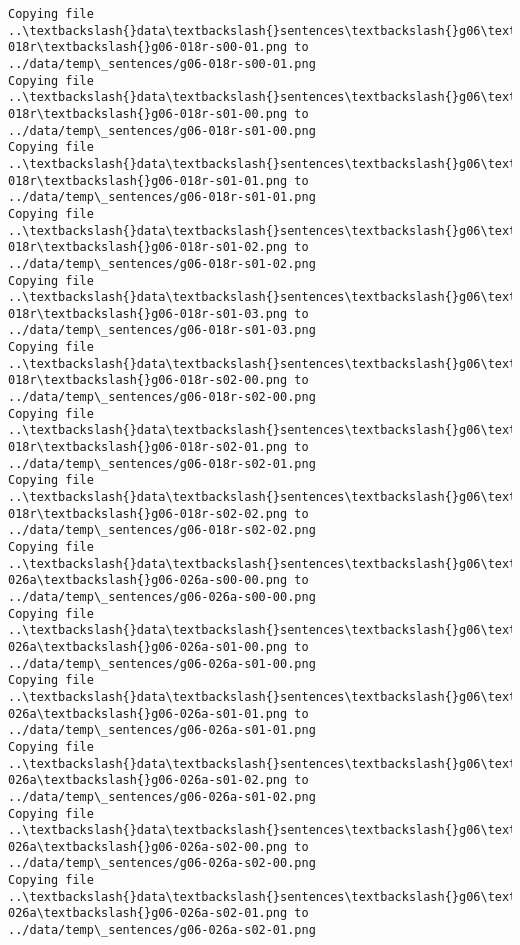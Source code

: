 \documentclass[11pt]{article}
\begin{document}
\begin{Verbatim}[commandchars=\\\{\}]
Copying file ..\textbackslash{}data\textbackslash{}sentences\textbackslash{}g06\textbackslash{}g06-018r\textbackslash{}g06-018r-s00-01.png to
../data/temp\_sentences/g06-018r-s00-01.png
Copying file ..\textbackslash{}data\textbackslash{}sentences\textbackslash{}g06\textbackslash{}g06-018r\textbackslash{}g06-018r-s01-00.png to
../data/temp\_sentences/g06-018r-s01-00.png
Copying file ..\textbackslash{}data\textbackslash{}sentences\textbackslash{}g06\textbackslash{}g06-018r\textbackslash{}g06-018r-s01-01.png to
../data/temp\_sentences/g06-018r-s01-01.png
Copying file ..\textbackslash{}data\textbackslash{}sentences\textbackslash{}g06\textbackslash{}g06-018r\textbackslash{}g06-018r-s01-02.png to
../data/temp\_sentences/g06-018r-s01-02.png
Copying file ..\textbackslash{}data\textbackslash{}sentences\textbackslash{}g06\textbackslash{}g06-018r\textbackslash{}g06-018r-s01-03.png to
../data/temp\_sentences/g06-018r-s01-03.png
Copying file ..\textbackslash{}data\textbackslash{}sentences\textbackslash{}g06\textbackslash{}g06-018r\textbackslash{}g06-018r-s02-00.png to
../data/temp\_sentences/g06-018r-s02-00.png
Copying file ..\textbackslash{}data\textbackslash{}sentences\textbackslash{}g06\textbackslash{}g06-018r\textbackslash{}g06-018r-s02-01.png to
../data/temp\_sentences/g06-018r-s02-01.png
Copying file ..\textbackslash{}data\textbackslash{}sentences\textbackslash{}g06\textbackslash{}g06-018r\textbackslash{}g06-018r-s02-02.png to
../data/temp\_sentences/g06-018r-s02-02.png
Copying file ..\textbackslash{}data\textbackslash{}sentences\textbackslash{}g06\textbackslash{}g06-026a\textbackslash{}g06-026a-s00-00.png to
../data/temp\_sentences/g06-026a-s00-00.png
Copying file ..\textbackslash{}data\textbackslash{}sentences\textbackslash{}g06\textbackslash{}g06-026a\textbackslash{}g06-026a-s01-00.png to
../data/temp\_sentences/g06-026a-s01-00.png
Copying file ..\textbackslash{}data\textbackslash{}sentences\textbackslash{}g06\textbackslash{}g06-026a\textbackslash{}g06-026a-s01-01.png to
../data/temp\_sentences/g06-026a-s01-01.png
Copying file ..\textbackslash{}data\textbackslash{}sentences\textbackslash{}g06\textbackslash{}g06-026a\textbackslash{}g06-026a-s01-02.png to
../data/temp\_sentences/g06-026a-s01-02.png
Copying file ..\textbackslash{}data\textbackslash{}sentences\textbackslash{}g06\textbackslash{}g06-026a\textbackslash{}g06-026a-s02-00.png to
../data/temp\_sentences/g06-026a-s02-00.png
Copying file ..\textbackslash{}data\textbackslash{}sentences\textbackslash{}g06\textbackslash{}g06-026a\textbackslash{}g06-026a-s02-01.png to
../data/temp\_sentences/g06-026a-s02-01.png

\end{Verbatim}
\end{document}
